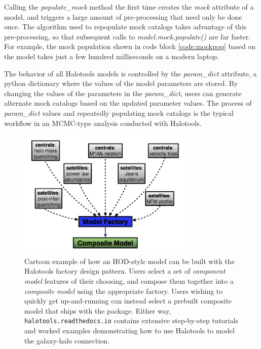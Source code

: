 \documentclass[twocolumn, tighten]{aastex6}
\begin{document}


Calling the {\em populate\_mock} method the first time creates the {\em mock} attribute of a model, and triggers a large amount of pre-processing that need only be done once. The algorithm used to repopulate mock catalogs takes advantage of this pre-processing, so that subsequent calls to {\em model.mock.populate()} are far faster. For example, the mock population shown in code block \ref{code:mockpop} based on the \citet{leauthaud11b} model takes just a few hundred milliseconds on a modern laptop. 

The behavior of all Halotools models is controlled by the {\em param\_dict} attribute, a python dictionary where the values of the model parameters are stored. By changing the values of the parameters in the {\em param\_dict}, users can generate alternate mock catalogs based on the updated parameter values. The process of {\em param\_dict} values and repeatedly populating mock catalogs is the typical workflow in an MCMC-type analysis conducted with Halotools. 

\begin{figure}
\begin{center}
\includegraphics[width=8.3cm]{./FIGS/halotools_design.png}
\caption{
Cartoon example of how an HOD-style model can be built with the Halotools factory design pattern. Users select a set of {\em component model} features of their choosing, and compose them together into a {\em composite model} using the appropriate factory. Users wishing to quickly get up-and-running can instead select a prebuilt composite model that ships with the package. Either way, {\tt halotools.readthedocs.io} contains extensive step-by-step tutorials and worked examples demonstrating how to use Halotools to model the galaxy-halo connection. 
}
\label{fig:modeling}
\end{center}
\end{figure}
\end{document}
